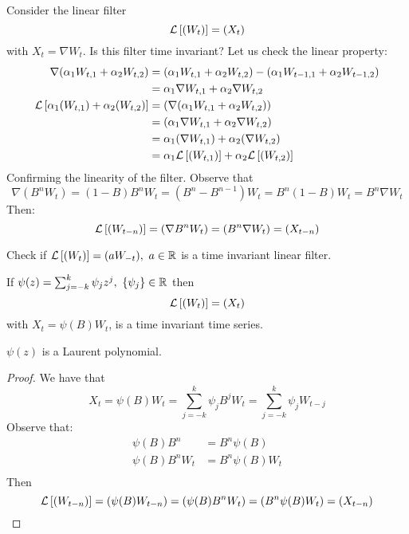 \begin{example}
    Consider the linear filter
    \[
        \mathcal{L}\left[(W_t)\right]=(X_t)  
    \]
    with $X_t=\nabla W_t$. Is this filter time invariant? Let us check the linear property:
    \begin{equation*}
        \begin{split}
            \nabla(\alpha_1W_{t,1}+\alpha_2W_{t,2})&=(\alpha_1W_{t,1}+\alpha_2W_{t,2})-(\alpha_1W_{t-1,1}+\alpha_2W_{t-1,2})\\
            &=\alpha_1\nabla W_{t,1}+\alpha_2\nabla W_{t,2}\\
            \mathcal{L}\left[\alpha_1(W_{t,1})+\alpha_2(W_{t,2})\right]&=(\nabla(\alpha_1W_{t,1}+\alpha_2W_{t,2}))\\
            &=(\alpha_1\nabla W_{t,1}+\alpha_2\nabla W_{t,2})\\
            &=\alpha_1(\nabla W_{t,1})+\alpha_2(\nabla W_{t,2})\\
            &=\alpha_1\mathcal{L}\left[(W_{t,1})\right]+\alpha_2\mathcal{L}\left[(W_{t,2})\right]\\
        \end{split}
    \end{equation*}
    Confirming the linearity of the filter. Observe that
    \[
        \nabla(B^nW_t)=(1-B)B^nW_t=(B^n-B^{n-1})W_t=B^n(1-B)W_t=B^n\nabla W_t
    \]
    Then:
    \[
        \mathcal{L}\left[(W_{t-n})\right]=(\nabla B^nW_t)=(B^n\nabla W_t)=(X_{t-n})  
    \]
\end{example}

\begin{exercise}
    Check if $\lf{(W_t)}=(aW_{-t}),\ a\in\R$ is a time invariant linear filter.
\end{exercise}

\begin{proposition}
    If $\psi(z)=\sum_{j=-k}^k\psi_jz^j,\ \set{\psi_j}\in\R$ then
    \[
        \mathcal{L}\left[(W_t)\right]=(X_t)  
    \]
    with $X_t=\psi(B)W_t$, is a time invariant time series.
\end{proposition}

\begin{remark}
    $\psi(z)$ is a Laurent polynomial.
\end{remark}

\begin{proof}
    We have that
    \[
        X_t=\psi(B)W_t=\sum_{j=-k}^k\psi_jB^jW_t=\sum_{j=-k}^k\psi_jW_{t-j}
    \]
    Observe that: 
    \begin{equation*}
        \begin{split}
            \psi(B)B^n&=B^n\psi(B)\\
            \psi(B)B^nW_t&=B^n\psi(B)W_t\\
        \end{split}
    \end{equation*}
    Then
    \[
        \mathcal{L}\left[(W_{t-n})\right]=(\psi(B)W_{t-n})=(\psi(B)B^nW_t)=(B^n\psi(B)W_t)=(X_{t-n})  
    \]
\end{proof}

